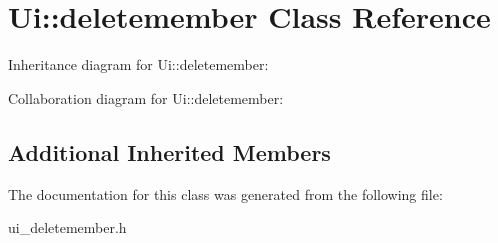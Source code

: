 \section{Ui\+:\+:deletemember Class Reference}
\label{class_ui_1_1deletemember}


Inheritance diagram for Ui\+:\+:deletemember\+:


Collaboration diagram for Ui\+:\+:deletemember\+:
\subsection*{Additional Inherited Members}


The documentation for this class was generated from the following file\+:\begin{DoxyCompactItemize}
\item 
ui\+\_\+deletemember.\+h\end{DoxyCompactItemize}
